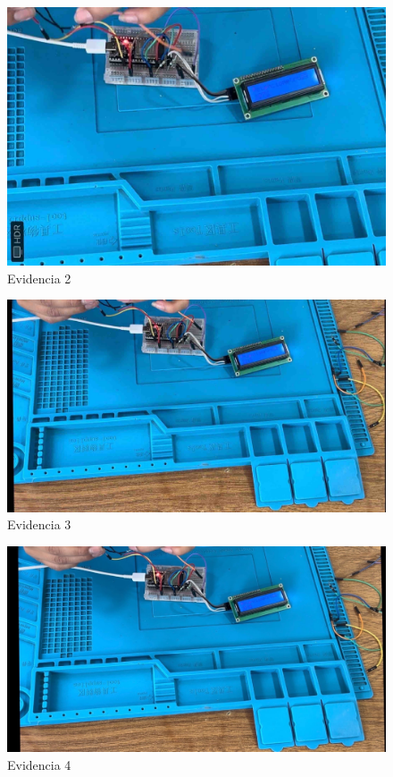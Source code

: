     \begin{figure}[H]
        \centering
        \includegraphics[trim = {0mm 0mm 0mm 0mm},clip,scale=0.2]{8/Img/Evidencia 2.pdf}
        \caption{Evidencia 2}
        \label{Evidencia 2}
    \end{figure}
    
    \begin{figure}[H]
        \centering
        \includegraphics[trim = {0mm 0mm 0mm 0mm},clip,scale=0.2]{8/Img/Evidencia 3.pdf}
        \caption{Evidencia 3}
        \label{Evidencia 3}
    \end{figure}
    
    \begin{figure}[H]
        \centering
        \includegraphics[trim = {0mm 0mm 0mm 0mm},clip,scale=0.2]{8/Img/Evidencia 4.pdf}
        \caption{Evidencia 4}
        \label{Evidencia 4}
    \end{figure}
    
